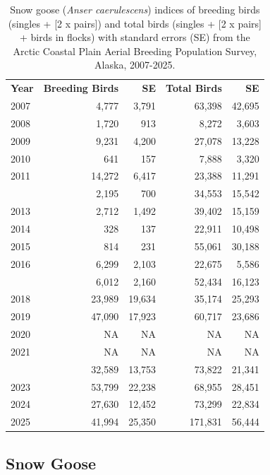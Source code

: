 \documentclass[
]{article}
\begin{document}
\begin{longtable}[t]{lrrrr}

\caption{\label{tbl-SNGO}Snow goose (\emph{Anser caerulescens}) indices
of breeding birds (singles + {[}2 x pairs{]}) and total birds (singles +
{[}2 x pairs{]} + birds in flocks) with standard errors (SE) from the
Arctic Coastal Plain Aerial Breeding Population Survey, Alaska,
2007-2025.}

\tabularnewline

\\
\toprule
\textbf{Year} & \textbf{Breeding Birds} & \textbf{SE} & \textbf{Total Birds} & \textbf{SE}\\
\midrule
2007 & 4,777 & 3,791 & 63,398 & 42,695\\
2008 & 1,720 & 913 & 8,272 & 3,603\\
2009 & 9,231 & 4,200 & 27,078 & 13,228\\
2010 & 641 & 157 & 7,888 & 3,320\\
2011 & 14,272 & 6,417 & 23,388 & 11,291\\
\addlinespace
2012 & 2,195 & 700 & 34,553 & 15,542\\
2013 & 2,712 & 1,492 & 39,402 & 15,159\\
2014 & 328 & 137 & 22,911 & 10,498\\
2015 & 814 & 231 & 55,061 & 30,188\\
2016 & 6,299 & 2,103 & 22,675 & 5,586\\
\addlinespace
2017 & 6,012 & 2,160 & 52,434 & 16,123\\
2018 & 23,989 & 19,634 & 35,174 & 25,293\\
2019 & 47,090 & 17,923 & 60,717 & 23,686\\
2020 & NA & NA & NA & NA\\
2021 & NA & NA & NA & NA\\
\addlinespace
2022 & 32,589 & 13,753 & 73,822 & 21,341\\
2023 & 53,799 & 22,238 & 68,955 & 28,451\\
2024 & 27,630 & 12,452 & 73,299 & 22,834\\
2025 & 41,994 & 25,350 & 171,831 & 56,444\\
\bottomrule

\end{longtable}

\endgroup{}

\newpage{}

\subsection*{Snow Goose}\label{snow-goose-2}
\end{document}
